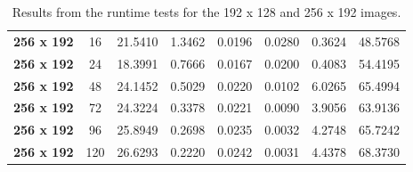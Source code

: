 \documentclass[11pt, a4paper]{article}
\begin{document}
\begin{table}
\begin{tabular}{|c|c|c|c|c|c|c|c|}
				\textbf{256 x 192} & 16    & 21.5410 & 1.3462 & 0.0196 & 0.0280 & 0.3624 & 48.5768 \\
				\textbf{256 x 192} & 24    & 18.3991 & 0.7666 & 0.0167 & 0.0200 & 0.4083 & 54.4195 \\
				\textbf{256 x 192} & 48    & 24.1452 & 0.5029 & 0.0220 & 0.0102 & 6.0265 & 65.4994 \\
				\textbf{256 x 192} & 72    & 24.3224 & 0.3378 & 0.0221 & 0.0090 & 3.9056 & 63.9136 \\
				\textbf{256 x 192} & 96    & 25.8949 & 0.2698 & 0.0235 & 0.0032 & 4.2748 & 65.7242 \\
				\textbf{256 x 192} & 120   & 26.6293 & 0.2220 & 0.0242 & 0.0031 & 4.4378 & 68.3730 \\
				\hline
			\end{tabular}
		  \caption{Results from the runtime tests for the 192 x 128 and 256 x 192 images.}
		  \label{tab:all_data1}
		  
		\newpage
		\end{table}	
\end{document}
